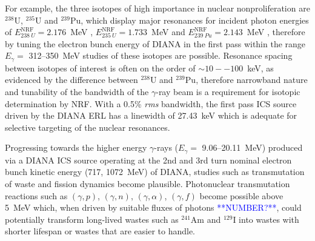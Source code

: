 \documentclass[../main.tex]{subfiles}
\begin{document}
For example, the three isotopes of high importance in nuclear nonproliferation are $^{238}\mathrm{U}$, $^{235}\mathrm{U}$ and $^{239}\mathrm{Pu}$, which display major resonances for incident photon energies of $E_{238~U}^{\mathrm{NRF}} = 2.176$~\si{\mega\electronvolt} \cite{quiter2011transmission},  $E_{235~U}^{\mathrm{NRF}} = 1.733$~\si{\mega\electronvolt} and  $E_{239~Pu}^{\mathrm{NRF}} = 2.143$~\si{\mega\electronvolt} \cite{hayakawa2010nondestructive}, therefore by tuning the electron bunch energy of DIANA in the first pass within the range $E_{\gamma} =$ 312--350~\si{\mega\electronvolt} studies of these isotopes are possible. Resonance spacing between isotopes of interest is often on the order of $\sim10--100$~\si{\kilo\electronvolt}, as evidenced by the difference between $^{238}\mathrm{U}$ and $^{239}\mathrm{Pu}$, therefore narrowband nature and tunability of the bandwidth of the $\gamma$-ray beam is a requirement for isotopic determination by NRF. With a 0.5\% \textit{rms} bandwidth, the first pass ICS source driven by the DIANA ERL has a linewidth of 27.43~\si{\kilo\electronvolt} which is adequate for selective targeting of the nuclear resonances.    

Progressing towards the higher energy $\gamma$-rays ($E_{\gamma} =$ 9.06--20.11~\si{\mega\electronvolt}) produced via a DIANA ICS source operating at the 2nd and 3rd turn nominal electron bunch kinetic energy (717, 1072~\si{\mega\electronvolt}) of DIANA, studies such as transmutation of waste and fission dynamics become plausible. Photonuclear transmutation reactions such as $(\gamma,p)$, $(\gamma,n)$, $(\gamma,\alpha)$, $(\gamma,f)$ become possible above 5~\si{\mega\electronvolt} which, when driven by suitable fluxes of photons \textcolor{blue}{**NUMBER?**}, could potentially transform long-lived wastes such as $^{241}\mathrm{Am}$ and $^{129}\mathrm{I}$ into wastes with shorter lifespan or wastes that are easier to handle. 
\end{document}
